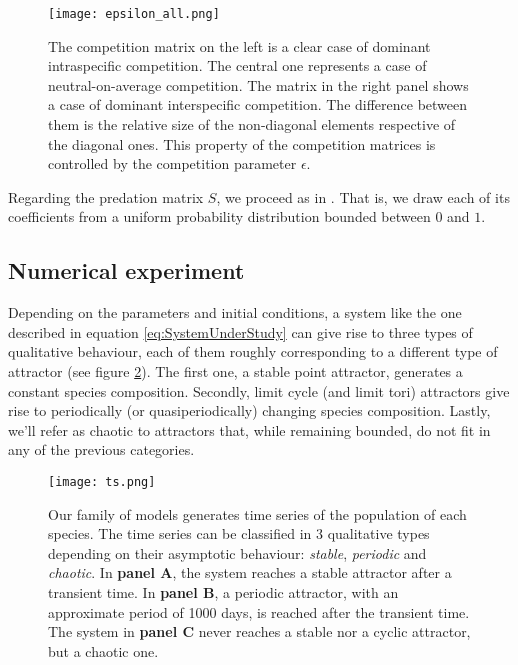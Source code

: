 \begin{figure}[H]
	\begin{center}
		\texttt{[image: epsilon\_all.png]}
	\end{center}
	\caption{The competition matrix on the left is a clear case of dominant intraspecific competition. The central one represents a case of neutral-on-average competition. The matrix in the right panel shows a case of dominant interspecific competition. The difference between them is the relative size of the non-diagonal elements respective of the diagonal ones. This property of the competition matrices is controlled by the competition parameter $\epsilon$.}
	\label{fig:CompetitionParameter}
\end{figure}

Regarding the predation matrix $S$, we proceed as in \citet{Dakos2009b}. That is, we draw each of its coefficients from a uniform probability distribution bounded between $0$ and $1$.

\subsection{Numerical experiment}
\label{subsec:NumericalExperiment}

Depending on the parameters and initial conditions, a system like the one described in equation \eqref{eq:SystemUnderStudy} can give rise to three types of qualitative behaviour, each of them roughly corresponding to a different type of attractor (see figure \ref{fig:TimeSeries}). The first one, a stable point attractor, generates a constant species composition. Secondly, limit cycle (and limit tori) attractors give rise to periodically (or quasiperiodically) changing species composition. Lastly, we'll refer as chaotic to attractors that, while remaining bounded, do not fit in any of the previous categories.

\begin{figure}
	\begin{center}
		\texttt{[image: ts.png]}
	\end{center}
	\caption{Our family of models generates time series of the population of each species. The time series can be classified in $3$ qualitative types depending on their asymptotic behaviour: \textit{stable}, \textit{periodic} and \textit{chaotic}. In \textbf{panel A}, the system reaches a stable attractor after a transient time. In \textbf{panel B}, a periodic attractor, with an approximate period of 1000 days, is reached after the transient time. The system in \textbf{panel C} never reaches a stable nor a cyclic attractor, but a chaotic one.}
	\label{fig:TimeSeries}
\end{figure}


